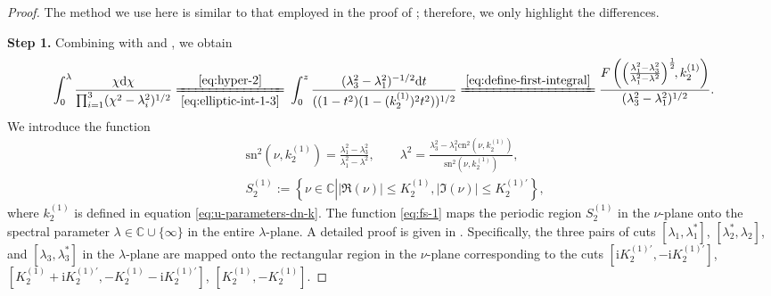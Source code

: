 \documentclass[11pt,reqno]{amsart}
\newcommand{\ii}{\mathrm{i}}
\newcommand{\sn}{\mathrm{sn}}
\newcommand{\cn}{\mathrm{cn}}
\newcommand{\dd}{\mathrm{d}}
\numberwithin{equation}{section}
\begin{document}
\begin{proof}
	The method we use here is similar to that employed in the proof of ; therefore, we only highlight the differences. 
	
	\textbf{Step 1.}
	Combining with  and , 
	we obtain 
	\begin{equation}\nonumber
		\begin{split}
			\int_{0}^{\lambda}\frac{\chi \dd \chi}{\prod_{i=1}^3(\chi^2-\lambda_i^2)^{1/2}}\xlongequal[\eqref{eq:elliptic-int-1-3}]{\eqref{eq:hyper-2}}&\ 
			\int_{0}^{z}\frac{(\lambda_3^2-\lambda_1^2)^{-1/2}\dd t}{((1-t^2)(1-(k^{(1)}_2)^2t^2))^{1/2}}
			\xlongequal{\eqref{eq:define-first-integral}} %
			 \frac{F\left(\left(\frac{\lambda_1^2-\lambda_3^2}{\lambda_1^2-\lambda^2}\right)^{\frac{1}{2}}\! \! ,k^{(1)}_2\right)}{(\lambda_3^2-\lambda_1^2)^{1/2}} . %
		\end{split}	
	\end{equation}
	We introduce the function
	\begin{equation}\label{eq:fs-1}
		\begin{split}
			& \sn^2(\nu,  k^{(1)}_2)=\frac{\lambda_1^2-\lambda_3^2}{\lambda_1^2-\lambda^2}, \qquad \lambda^2=\frac{\lambda_3^2-\lambda_1^2\cn^2(\nu,  k^{(1)}_2)}{\sn^2(\nu,  k^{(1)}_2)}, \\
			& S^{(1)} _2:=\left\{\nu\in \mathbb{C}\left| |\Re(\nu)| \le   K^{(1)}_2,  |\Im(\nu)| \le   K^{(1)\prime}_2 \right.\right\},
		\end{split} 
	\end{equation}
	where $k^{(1)}_2$ is defined in equation \eqref{eq:u-parameters-dn-k}.
	The function \eqref{eq:fs-1} maps the periodic region $ S^{(1)} _{2}$ in the $\nu$-plane onto the spectral parameter $\lambda\in \mathbb{C}\cup \{\infty\}$ in the entire $\lambda$-plane. 
	A detailed proof is given in \Cref{prop:appendenx-f-1-2}. 
	Specifically, the three pairs of cuts $[\lambda_1, \lambda_1^*]$, $[\lambda_2^*, \lambda_2]$, and $[\lambda_3, \lambda_3^*]$ in the $\lambda$-plane are mapped onto the rectangular region in the $\nu$-plane corresponding to the cuts $[\ii K^{(1)\prime}_2, -\ii K^{(1)\prime}_2]$, $[K^{(1)}_2+\ii K^{(1)\prime}_2, -K^{(1)}_2-\ii K^{(1)\prime}_2 ]$, $[K^{(1)}_2, -K^{(1)}_2]$.
	

\end{proof}
\end{document}

